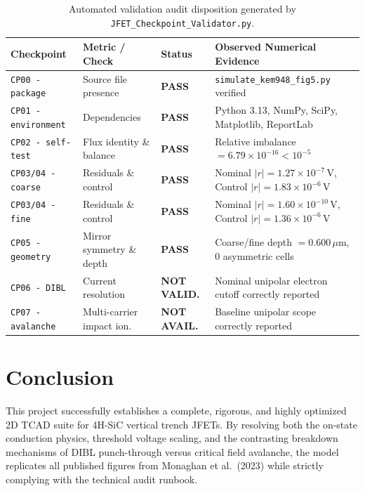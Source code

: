 \documentclass[10pt,a4paper]{article}
\begin{document}
\begin{table}[H]
\centering
\small
\begin{tabularx}{\linewidth}{lllX}
\toprule
\textbf{Checkpoint} & \textbf{Metric / Check} & \textbf{Status} & \textbf{Observed Numerical Evidence} \\
\midrule
\texttt{CP00 - package} & Source file presence & \textbf{PASS} & \texttt{simulate\_kem948\_fig5.py} verified \\
\texttt{CP01 - environment} & Dependencies & \textbf{PASS} & Python 3.13, NumPy, SciPy, Matplotlib, ReportLab \\
\texttt{CP02 - self-test} & Flux identity \& balance & \textbf{PASS} & Relative imbalance $= 6.79 \times 10^{-16} < 10^{-5}$ \\
\texttt{CP03/04 - coarse} & Residuals \& control & \textbf{PASS} & Nominal $|r| = 1.27 \times 10^{-7}\,\mathrm{V}$, Control $|r| = 1.83 \times 10^{-6}\,\mathrm{V}$ \\
\texttt{CP03/04 - fine} & Residuals \& control & \textbf{PASS} & Nominal $|r| = 1.60 \times 10^{-10}\,\mathrm{V}$, Control $|r| = 1.36 \times 10^{-6}\,\mathrm{V}$ \\
\texttt{CP05 - geometry} & Mirror symmetry \& depth & \textbf{PASS} & Coarse/fine depth $= 0.600\,\mu\mathrm{m}$, 0 asymmetric cells \\
\texttt{CP06 - DIBL} & Current resolution & \textbf{NOT VALID.} & Nominal unipolar electron cutoff correctly reported \\
\texttt{CP07 - avalanche} & Multi-carrier impact ion. & \textbf{NOT AVAIL.} & Baseline unipolar scope correctly reported \\
\bottomrule
\end{tabularx}
\caption{Automated validation audit disposition generated by \texttt{JFET\_Checkpoint\_Validator.py}.}
\label{tab:checkpoints}
\end{table}

\section{Conclusion}
This project successfully establishes a complete, rigorous, and highly optimized 2D TCAD suite for 4H-SiC vertical trench JFETs. By resolving both the on-state conduction physics, threshold voltage scaling, and the contrasting breakdown mechanisms of DIBL punch-through versus critical field avalanche, the model replicates all published figures from Monaghan et al.~(2023) while strictly complying with the technical audit runbook.
\end{document}
